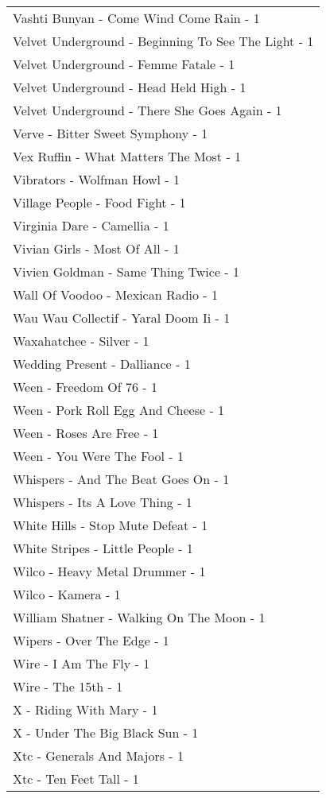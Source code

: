 \documentclass[
]{article}
\begin{document}
\begin{longtable}{l}
Vashti Bunyan - Come Wind Come Rain - 1 \\ 
Velvet Underground - Beginning To See The Light - 1 \\ 
Velvet Underground - Femme Fatale - 1 \\ 
Velvet Underground - Head Held High - 1 \\ 
Velvet Underground - There She Goes Again - 1 \\ 
Verve - Bitter Sweet Symphony - 1 \\ 
Vex Ruffin - What Matters The Most - 1 \\ 
Vibrators - Wolfman Howl - 1 \\ 
Village People - Food Fight - 1 \\ 
Virginia Dare - Camellia - 1 \\ 
Vivian Girls - Most Of All - 1 \\ 
Vivien Goldman - Same Thing Twice - 1 \\ 
Wall Of Voodoo - Mexican Radio - 1 \\ 
Wau Wau Collectif - Yaral Doom Ii - 1 \\ 
Waxahatchee - Silver - 1 \\ 
Wedding Present - Dalliance - 1 \\ 
Ween - Freedom Of 76 - 1 \\ 
Ween - Pork Roll Egg And Cheese - 1 \\ 
Ween - Roses Are Free - 1 \\ 
Ween - You Were The Fool - 1 \\ 
Whispers - And The Beat Goes On - 1 \\ 
Whispers - Its A Love Thing - 1 \\ 
White Hills - Stop Mute Defeat - 1 \\ 
White Stripes - Little People - 1 \\ 
Wilco - Heavy Metal Drummer - 1 \\ 
Wilco - Kamera - 1 \\ 
William Shatner - Walking On The Moon - 1 \\ 
Wipers - Over The Edge - 1 \\ 
Wire - I Am The Fly - 1 \\ 
Wire - The 15th - 1 \\ 
X - Riding With Mary - 1 \\ 
X - Under The Big Black Sun - 1 \\ 
Xtc - Generals And Majors - 1 \\ 
Xtc - Ten Feet Tall - 1 \\ 

\end{longtable}
\end{document}
